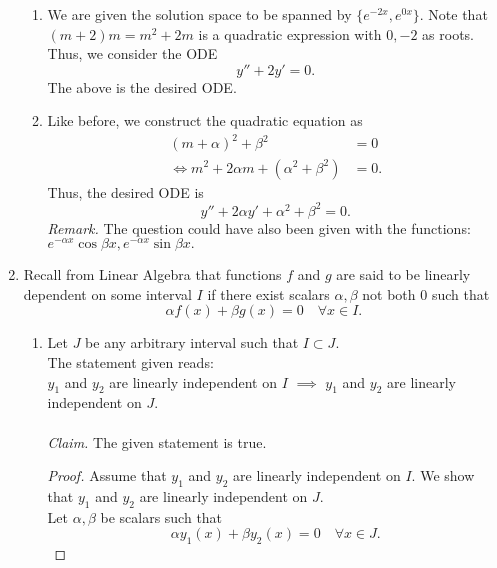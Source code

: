 \documentclass[12pt]{article}
\theoremstyle{definition}
\numberwithin{thm}{section}
\begin{document}
\begin{enumerate}[leftmargin=*, label = Q.\arabic*.]
\begin{enumerate}[label = (\roman*)]
		\item We are given the solution space to be spanned by $\{e^{-2x}, e^{0x}\}.$ Note that $(m + 2)m = m^2 + 2m$ is a quadratic expression with $0, -2$ as roots. Thus, we consider the ODE
		\[y'' + 2y' = 0.\]
		The above is the desired ODE.
		\item Like before, we construct the quadratic equation as
		\begin{align*} 
			(m + \alpha)^2 + \beta^2 &= 0\\
			\iff m^2 + 2\alpha m + (\alpha^2 + \beta^2) &= 0.
		\end{align*}
		Thus, the desired ODE is
		\[y'' + 2\alpha y' + \alpha^2 + \beta^2 = 0.\]
		\emph{Remark.} The question could have also been given with the functions: $e^{-\alpha x}\cos\beta x, e^{-\alpha x}\sin\beta x.$
	\end{enumerate}
	\item Recall from Linear Algebra that functions $f$ and $g$ are said to be linearly dependent on some interval $I$ if there exist scalars $\alpha, \beta$ not both $0$ such that
	\[\alpha f(x) + \beta g(x) = 0 \quad \forall x \in I.\]
	\begin{enumerate}[label = (\roman*)] 
		\item Let $J$ be any arbitrary interval such that $I \subset J.$\\
		The statement given reads:\\
		$y_1$ and $y_2$ are linearly independent on $I$ $\implies$ $y_1$ and $y_2$ are linearly independent on $J.$\\\\
		\emph{Claim.} The given statement is true.
		\begin{proof} 
			Assume that $y_1$ and $y_2$ are linearly independent on $I.$ We show that $y_1$ and $y_2$ are linearly independent on $J.$\\
			Let $\alpha, \beta$ be scalars such that
			\begin{equation} \label{eq:linJ}
			\alpha y_1(x) + \beta y_2(x) = 0 \quad \forall x \in J.
			\end{equation}
				

\end{proof}
\end{enumerate}
\end{enumerate}
\end{document}
